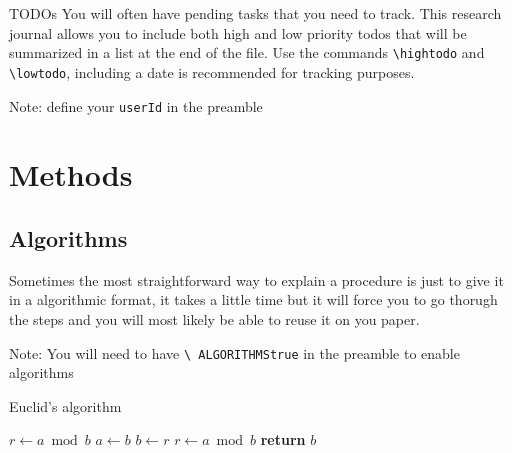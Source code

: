 \documentclass{project-logbook}
\begin{document}
{\begin{tipt}{TODOs}
You will often have pending tasks that you need to track. This research journal allows you to include both high and low priority todos that will be summarized in a list at the end of the file. Use the commands \texttt{\textbackslash hightodo} and \texttt{\textbackslash lowtodo}, including a date is recommended for tracking purposes.

Note: define your \texttt{userId} in the preamble
\end{tipt}




\newpage
\section{Methods} %
\label{sec:methods}

\subsection{Algorithms} %
\label{sub:algorithms}

\begin{tip}
Sometimes the most straightforward way to explain a procedure is just to give it in a algorithmic format, it takes a little time but it will force you to go thorugh the steps and you will most likely be able to reuse it on you paper.

Note: You will need to have \texttt{\textbackslash
ALGORITHMStrue} in the preamble to enable algorithms
\end{tip}

\begin{algorithm}
\caption{Euclid’s algorithm}\label{alg:euclid}
\begin{algorithmic}[1]
\State $r\gets a\bmod b$
\State $a\gets b$
\State $b\gets r$
\State $r\gets a\bmod b$
\EndWhile\label{euclidendwhile}
\State \textbf{return} $b$
\EndProcedure
\end{algorithmic}
\end{algorithm}


}
\end{document}
